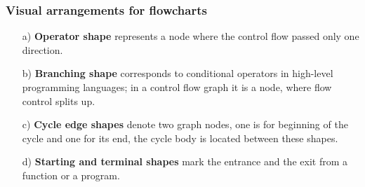 \documentclass{beamer}
\begin{document}
\begin{frame}
\frametitle{Visual arrangements for flowcharts}
\begin{enumerate}
\item [a)]\textbf{Operator shape} represents a node where the control flow passed only one direction.
\item [b)]\textbf{Branching shape} corresponds to conditional operators in high-level programming languages; in a control flow graph it is a node, where flow control splits up.
\item [c)]\textbf{Cycle edge shapes} denote two graph nodes, one is for beginning of the cycle and one for its end, the cycle body is located between these shapes.
\item [d)]\textbf{Starting and terminal shapes} mark the entrance and the exit from a function or a program.
	\end{enumerate}


\end{frame}
\end{document}

